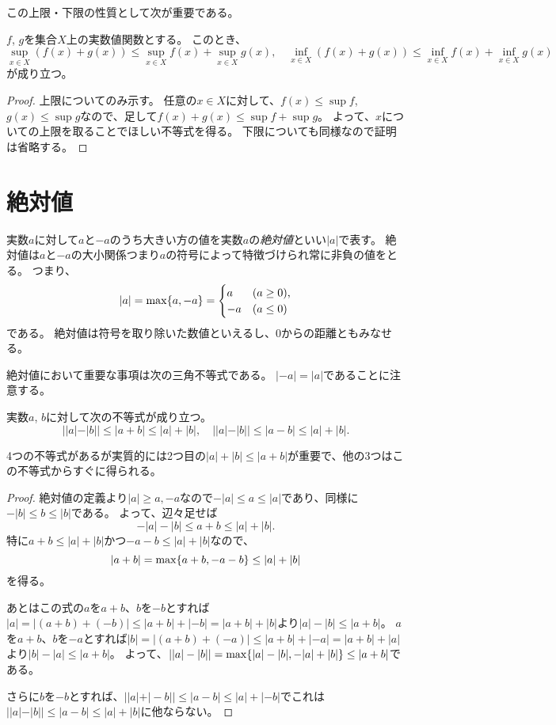 この上限・下限の性質として次が重要である。

\begin{proposition}[和と上限・下限]
$f$, $g$を集合$X$上の実数値関数とする。
このとき、
$$
\sup_{x \in X}(f(x)+g(x)) \le \sup_{x \in X}f(x)+\sup_{x \in X}g(x),
\quad \inf_{x \in X}(f(x)+g(x)) \le \inf_{x \in X}f(x)+\inf_{x \in X}g(x)
$$
が成り立つ。
\end{proposition}

\begin{proof}
上限についてのみ示す。
任意の$x \in X$に対して、$f(x) \le \sup f$, $g(x) \le \sup g$なので、足して$f(x)+g(x) \le \sup f+\sup g$。
よって、$x$についての上限を取ることでほしい不等式を得る。
下限についても同様なので証明は省略する。
\end{proof}

\section{絶対値}

実数$a$に対して$a$と$-a$のうち大きい方の値を実数$a$の\emph{絶対値}といい$|a|$で表す。
絶対値は$a$と$-a$の大小関係つまり$a$の符号によって特徴づけられ常に非負の値をとる。
つまり、
$$
|a| = \max\{ a, -a \} =
\begin{cases}
a & \text{($a \ge 0$),} \\
-a & \text{($a \le 0$)}
\end{cases}
$$
である。
絶対値は符号を取り除いた数値といえるし、$0$からの距離ともみなせる。

絶対値において重要な事項は次の三角不等式である。
$|-a| = |a|$であることに注意する。

\begin{proposition}[実数の絶対値の三角不等式]
実数$a$, $b$に対して次の不等式が成り立つ。
$$
||a|-|b|| \le |a+b| \le |a|+|b|,
\quad ||a|-|b|| \le |a-b| \le |a|+|b|.
$$
\end{proposition}

4つの不等式があるが実質的には2つ目の$|a|+|b| \le |a+b|$が重要で、他の3つはこの不等式からすぐに得られる。

\begin{proof}
絶対値の定義より$|a| \ge a, -a$なので$-|a| \le a \le |a|$であり、同様に$-|b| \le b \le |b|$である。
よって、辺々足せば
$$
-|a|-|b| \le a+b \le |a|+|b|.
$$
特に$a+b \le |a|+|b|$かつ$-a-b \le |a|+|b|$なので、
$$
|a+b| = \max\{ a+b, -a-b \} \le |a|+|b|
$$
を得る。

あとはこの式の$a$を$a+b$、$b$を$-b$とすれば$|a| = |(a+b)+(-b)| \le |a+b|+|-b| = |a+b|+|b|$より$|a|-|b| \le |a+b|$。
$a$を$a+b$、$b$を$-a$とすれば$|b| = |(a+b)+(-a)| \le |a+b|+|-a| = |a+b|+|a|$より$|b|-|a| \le |a+b|$。
よって、$||a|-|b|| = \max\{ |a|-|b|, -|a|+|b| \} \le |a+b|$である。

さらに$b$を$-b$とすれば、$||a|+|-b|| \le |a-b| \le |a|+|-b|$でこれは$||a|-|b|| \le |a-b| \le |a|+|b|$に他ならない。
\end{proof}

